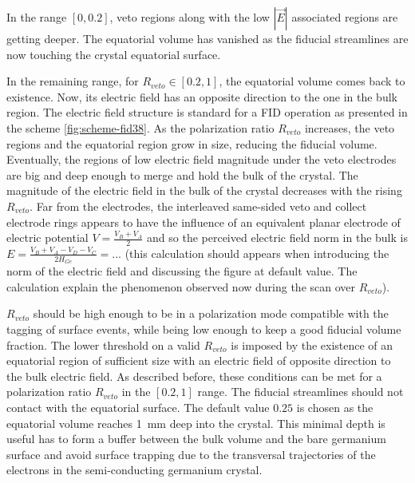 In the range $[0, 0.2]$, veto regions along with the low $|\vec{E}|$ associated regions are getting deeper. The equatorial volume has vanished as the fiducial streamlines are now touching the crystal equatorial surface. 

In the remaining range, for $R_{veto} \in [0.2, 1]$, the equatorial volume comes back to existence. Now, its electric field has an opposite direction to the one in the bulk region. The electric field structure is standard for a FID operation as presented in the scheme \ref{fig:scheme-fid38}. As the polarization ratio $R_{veto}$ increases, the veto regions and the equatorial region grow in size, reducing the fiducial volume. Eventually, the regions of low electric field magnitude under the veto electrodes are big and deep enough to merge and hold the bulk of the crystal.
The magnitude of the electric field in the bulk of the crystal decreases with the rising $R_{veto}$. Far from the electrodes, the interleaved same-sided veto and collect electrode rings appears to have the influence of an equivalent planar electrode of electric potential $V=\frac{V_B + V_A}{2}$ and so the perceived electric field norm in the bulk is $E = \frac{V_B + V_A - V_D - V_C}{2 H_{Ge}}=...$ (this calculation should appears when introducing the norm of the electric field and discussing the figure at default value. The calculation explain the phenomenon observed now during the scan over $R_{veto}$).

$R_{veto}$ should be high enough to be in a polarization mode compatible with the tagging of surface events, while being low enough to keep a good fiducial volume fraction. The lower threshold on a valid $R_{veto}$ is imposed by the existence of an equatorial region of sufficient size with an electric field of opposite direction to the bulk electric field. As described before, these conditions can be met for a polarization ratio $R_{veto}$ in the $[0.2, 1]$ range. The fiducial streamlines should not contact with the equatorial surface. The default value $0.25$ is chosen as the equatorial volume reaches \SI{1}{\mm} deep into the crystal. This minimal depth is useful has to form a buffer between the bulk volume and the bare germanium surface and avoid surface trapping due to the transversal trajectories of the electrons in the semi-conducting germanium crystal.

